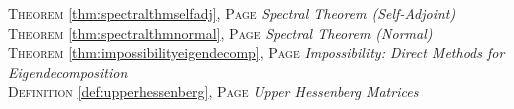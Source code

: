 \begin{multicols}{2}
{\textsc{Theorem} \ref{thm:spectralthmselfadj}, \textsc{Page} \pageref{thm:spectralthmselfadj} \textit{Spectral Theorem (Self-Adjoint)} \\
\textsc{Theorem} \ref{thm:spectralthmnormal}, \textsc{Page} \pageref{thm:spectralthmnormal} \textit{Spectral Theorem (Normal)} \\
\textsc{Theorem} \ref{thm:impossibilityeigendecomp}, \textsc{Page} \pageref{thm:impossibilityeigendecomp} \textit{Impossibility: Direct Methods for Eigendecomposition} \\
\textsc{Definition} \ref{def:upperhessenberg}, \textsc{Page} \pageref{def:upperhessenberg} \textit{Upper Hessenberg Matrices} \\

      }
\end{multicols}

